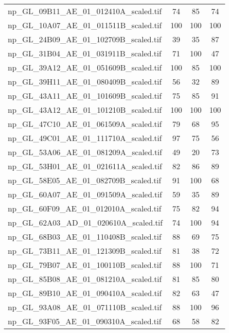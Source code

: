 \begin{tabular}{lccc}
 np\_GL\_09B11\_AE\_01\_012410A\_scaled.tif         & 74    & 85  & 74    \\
 np\_GL\_10A07\_AE\_01\_011511B\_scaled.tif         & 100   & 100 & 100   \\
 np\_GL\_24B09\_AE\_01\_102709B\_scaled.tif         & 39    & 35  & 87    \\
 np\_GL\_31B04\_AE\_01\_031911B\_scaled.tif         & 71    & 100 & 47    \\
 np\_GL\_39A12\_AE\_01\_051609B\_scaled.tif         & 100   & 85  & 100   \\
 np\_GL\_39H11\_AE\_01\_080409B\_scaled.tif         & 56    & 32  & 89    \\
 np\_GL\_43A11\_AE\_01\_101609B\_scaled.tif         & 75    & 85  & 91    \\
 np\_GL\_43A12\_AE\_01\_101210B\_scaled.tif         & 100   & 100 & 100   \\
 np\_GL\_47C10\_AE\_01\_061509A\_scaled.tif         & 79    & 68  & 95    \\
 np\_GL\_49C01\_AE\_01\_111710A\_scaled.tif         & 97    & 75  & 56    \\
 np\_GL\_53A06\_AE\_01\_081209A\_scaled.tif         & 49    & 20  & 73    \\
 np\_GL\_53H01\_AE\_01\_021611A\_scaled.tif         & 82    & 86  & 89    \\
 np\_GL\_58E05\_AE\_01\_082709B\_scaled.tif         & 91    & 100 & 68    \\
 np\_GL\_60A07\_AE\_01\_091509A\_scaled.tif         & 59    & 35  & 89    \\
 np\_GL\_60F09\_AE\_01\_012010A\_scaled.tif         & 75    & 82  & 94    \\
 np\_GL\_62A03\_AD\_01\_020610A\_scaled.tif         & 74    & 100 & 94    \\
 np\_GL\_68B03\_AE\_01\_110408B\_scaled.tif         & 88    & 69  & 75    \\
 np\_GL\_73B11\_AE\_01\_121309B\_scaled.tif         & 81    & 38  & 72    \\
 np\_GL\_79B07\_AE\_01\_100110B\_scaled.tif         & 88    & 100 & 71    \\
 np\_GL\_85B08\_AE\_01\_081210A\_scaled.tif         & 81    & 85  & 80    \\
 np\_GL\_89B10\_AE\_01\_090410A\_scaled.tif         & 82    & 63  & 47    \\
 np\_GL\_93A08\_AE\_01\_071110B\_scaled.tif         & 88    & 100 & 96    \\
 np\_GL\_93F05\_AE\_01\_090310A\_scaled.tif         & 68    & 58  & 82    \\

\end{tabular}
